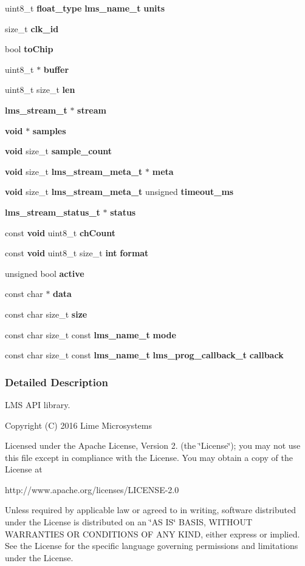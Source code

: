 \begin{DoxyCompactItemize}
uint8\+\_\+t {\bf float\+\_\+type} {\bf lms\+\_\+name\+\_\+t} {\bf units}
\item 
size\+\_\+t {\bf clk\+\_\+id}
\item 
bool {\bf to\+Chip}
\item 
uint8\+\_\+t $\ast$ {\bf buffer}
\item 
uint8\+\_\+t size\+\_\+t {\bf len}
\item 
{\bf lms\+\_\+stream\+\_\+t} $\ast$ {\bf stream}
\item 
{\bf void} $\ast$ {\bf samples}
\item 
{\bf void} size\+\_\+t {\bf sample\+\_\+count}
\item 
{\bf void} size\+\_\+t {\bf lms\+\_\+stream\+\_\+meta\+\_\+t} $\ast$ {\bf meta}
\item 
{\bf void} size\+\_\+t {\bf lms\+\_\+stream\+\_\+meta\+\_\+t} unsigned {\bf timeout\+\_\+ms}
\item 
{\bf lms\+\_\+stream\+\_\+status\+\_\+t} $\ast$ {\bf status}
\item 
const {\bf void} uint8\+\_\+t {\bf ch\+Count}
\item 
const {\bf void} uint8\+\_\+t size\+\_\+t {\bf int} {\bf format}
\item 
unsigned bool {\bf active}
\item 
const char $\ast$ {\bf data}
\item 
const char size\+\_\+t {\bf size}
\item 
const char size\+\_\+t const {\bf lms\+\_\+name\+\_\+t} {\bf mode}
\item 
const char size\+\_\+t const {\bf lms\+\_\+name\+\_\+t} {\bf lms\+\_\+prog\+\_\+callback\+\_\+t} {\bf callback}
\end{DoxyCompactItemize}


\subsubsection{Detailed Description}
L\+MS A\+PI library. 

Copyright (C) 2016 Lime Microsystems

Licensed under the Apache License, Version 2. (the \char`\"{}\+License\char`\"{}); you may not use this file except in compliance with the License. You may obtain a copy of the License at \begin{DoxyVerb}http://www.apache.org/licenses/LICENSE-2.0
\end{DoxyVerb}


Unless required by applicable law or agreed to in writing, software distributed under the License is distributed on an \char`\"{}\+A\+S I\+S\char`\"{} B\+A\+S\+IS, W\+I\+T\+H\+O\+UT W\+A\+R\+R\+A\+N\+T\+I\+ES OR C\+O\+N\+D\+I\+T\+I\+O\+NS OF A\+NY K\+I\+ND, either express or implied. See the License for the specific language governing permissions and limitations under the License. 

